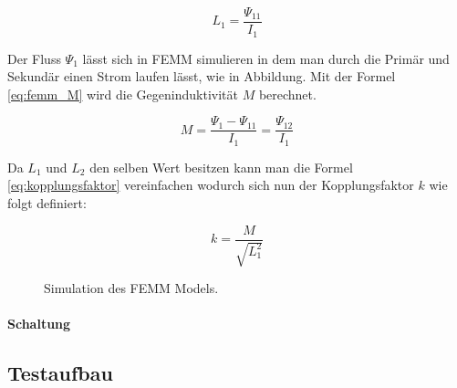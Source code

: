 \begin{equation}
L_{1}=\frac{\Psi_{11}}{I_{1}}
\label{eq:femm_l1}
\end{equation}

Der Fluss $ \Psi_{1} $ lässt sich in FEMM simulieren in dem man durch die Primär und Sekundär einen Strom laufen lässt, wie in Abbildung. Mit der Formel \ref{eq:femm_M} wird die Gegeninduktivität $ M $ berechnet.

\begin{equation}
M=\frac{\Psi_{1}-\Psi_{11}}{I_{1}}=\frac{\Psi_{12}}{I_{1}}
\label{eq:femm_M}
\end{equation}

Da $ L_{1} $ und $ L_{2} $ den selben Wert besitzen kann man die Formel \ref{eq:kopplungsfaktor} vereinfachen wodurch sich nun der Kopplungsfaktor $ k $ wie folgt definiert:

\begin{equation}
k=\frac{M}{\sqrt{L_{1}^{2}}}
\label{eq:kopplungsfaktor_neu}
\end{equation}



\begin{figure}[t]
	\centering
	\qquad
	\caption{Simulation des FEMM Models.}
	\label{fig:Subfigure}
\end{figure}

\paragraph{Schaltung}

\subsection{Testaufbau}

